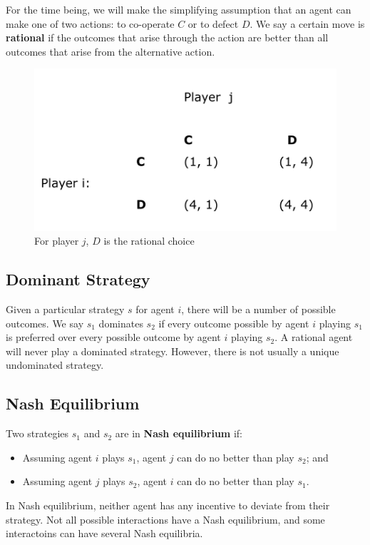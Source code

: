 \documentclass[a4paper,11pt]{article}
\begin{document}
For the time being, we will make the simplifying assumption that an agent can make one of two actions: to co-operate $C$ or to defect $D$.
We say a certain move is \textbf{rational} if the outcomes that arise through the action are better than all outcomes that arise from the alternative action.

\begin{figure}[H]
    \centering
    \includegraphics[width=\textwidth]{./images/rationalchoice.png}
    \caption{For player $j$, $D$ is the rational choice}
\end{figure}

\subsection{Dominant Strategy}
Given a particular strategy $s$ for agent $i$, there will be a number of possible outcomes.
We say $s_1$ dominates $s_2$ if every outcome possible by agent $i$ playing $s_1$ is preferred over every possible outcome by agent $i$ playing $s_2$.
A rational agent will never play a dominated strategy.
However, there is not usually a unique undominated strategy.

\subsection{Nash Equilibrium}
Two strategies $s_1$ and $s_2$ are in \textbf{Nash equilibrium} if:
\begin{itemize}
    \item   Assuming agent $i$ plays $s_1$, agent $j$ can do no better than play $s_2$; and
    \item   Assuming agent $j$ plays $s_2$, agent $i$ can do no better than play $s_1$.
\end{itemize}

In Nash equilibrium, neither agent has any incentive to deviate from their strategy.
Not all possible interactions have a Nash equilibrium, and some interactoins can have several Nash equilibria.
\end{document}
